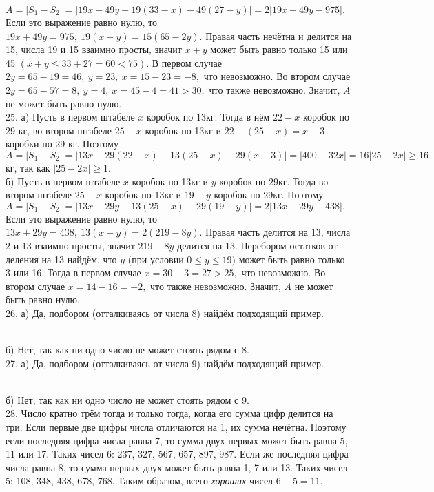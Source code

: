 $A=|S_1-S_2|=|19x+49y-19(33-x)-49(27-y)|=2|19x+49y-975|.$ Если это выражение равно нулю, то $19x+49y=975,\ 19(x+y)=15(65-2y).$ Правая часть нечётна и делится на 15, числа 19 и 15 взаимно просты, значит $x+y$ может быть равно только 15 или 45 $(x+y\leqslant33+27=60<75).$ В первом случае $2y=65-19=46,\ y=23,\ x=15-23=-8,$ что невозможно. Во втором случае $2y=65-57=8,\ y=4,\ x=45-4=41>30,$ что также невозможно. Значит, $A$ не может быть равно нулю.\\
25. а) Пусть в первом штабеле $x$ коробок по 13кг. Тогда в нём $22-x$ коробок по 29 кг, во втором штабеле $25-x$ коробок по 13кг и $22-(25-x)=x-3$ коробки по 29 кг.
Поэтому $A=|S_1-S_2|=|13x+29(22-x)-13(25-x)-29(x-3)|=|400-32x|=16|25-2x|\geqslant16$кг, так как $|25-2x|\geqslant1.$\\
б) Пусть в первом штабеле $x$ коробок по 13кг и $y$ коробок по 29кг. Тогда во втором штабеле $25-x$ коробок по 13кг и $19-y$ коробок по 29кг. Поэтому
$A=|S_1-S_2|=|13x+29y-13(25-x)-29(19-y)|=2|13x+29y-438|.$ Если это выражение равно нулю, то $13x+29y=438,\ 13(x+y)=2(219-8y).$ Правая часть делится на 13, числа 2 и 13 взаимно просты, значит $219-8y$ делится на 13. Перебором остатков от деления на 13 найдём, что $y$ (при условии $0\leqslant y\leqslant19)$ может быть равно только 3 или 16. Тогда в первом случае $x=30-3=27>25,$ что невозможно. Во втором случае $x=14-16=-2,$ что также невозможно. Значит, $A$ не может быть равно нулю.\\
26. а) Да, подбором (отталкиваясь от числа 8) найдём подходящий пример.
\begin{figure}[ht!]
\end{figure}\\
б) Нет, так как ни одно число не может стоять рядом с 8.\\
27. а) Да, подбором (отталкиваясь от числа 9) найдём подходящий пример.
\begin{figure}[ht!]
\end{figure}\\
б) Нет, так как ни одно число не может стоять рядом с 9.\\
28. Число кратно трём тогда и только тогда, когда его сумма цифр делится на три. Если первые две цифры числа отличаются на 1, их сумма нечётна. Поэтому если последняя цифра числа равна 7, то сумма двух первых может быть равна 5, 11 или 17. Таких чисел 6: 237, 327, 567, 657, 897, 987. Если же последняя цифра числа равна 8, то сумма первых двух может быть равна 1, 7 или 13. Таких чисел 5: 108, 348, 438, 678, 768. Таким образом, всего {\it хороших} чисел $6+5=11.$\\
